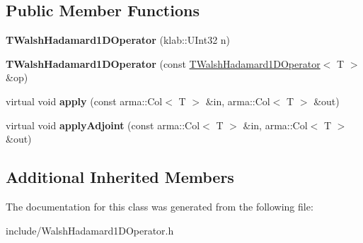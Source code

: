 \subsection*{Public Member Functions}
\begin{DoxyCompactItemize}
\item 
{\bfseries T\+Walsh\+Hadamard1\+D\+Operator} (klab\+::\+U\+Int32 n)\hypertarget{classkl1p_1_1TWalshHadamard1DOperator_aa87c8b3b2e55d6f3a4a65f2fb0772500}{}\label{classkl1p_1_1TWalshHadamard1DOperator_aa87c8b3b2e55d6f3a4a65f2fb0772500}

\item 
{\bfseries T\+Walsh\+Hadamard1\+D\+Operator} (const \hyperlink{classkl1p_1_1TWalshHadamard1DOperator}{T\+Walsh\+Hadamard1\+D\+Operator}$<$ T $>$ \&op)\hypertarget{classkl1p_1_1TWalshHadamard1DOperator_a350536977de79870f63e44941d4f306a}{}\label{classkl1p_1_1TWalshHadamard1DOperator_a350536977de79870f63e44941d4f306a}

\item 
virtual void {\bfseries apply} (const arma\+::\+Col$<$ T $>$ \&in, arma\+::\+Col$<$ T $>$ \&out)\hypertarget{classkl1p_1_1TWalshHadamard1DOperator_a764543e4ed2fc6352d2747d65ed54a48}{}\label{classkl1p_1_1TWalshHadamard1DOperator_a764543e4ed2fc6352d2747d65ed54a48}

\item 
virtual void {\bfseries apply\+Adjoint} (const arma\+::\+Col$<$ T $>$ \&in, arma\+::\+Col$<$ T $>$ \&out)\hypertarget{classkl1p_1_1TWalshHadamard1DOperator_acaf21e80701a9b719d7b6b50d03fc677}{}\label{classkl1p_1_1TWalshHadamard1DOperator_acaf21e80701a9b719d7b6b50d03fc677}

\end{DoxyCompactItemize}
\subsection*{Additional Inherited Members}


The documentation for this class was generated from the following file\+:\begin{DoxyCompactItemize}
\item 
include/Walsh\+Hadamard1\+D\+Operator.\+h\end{DoxyCompactItemize}
